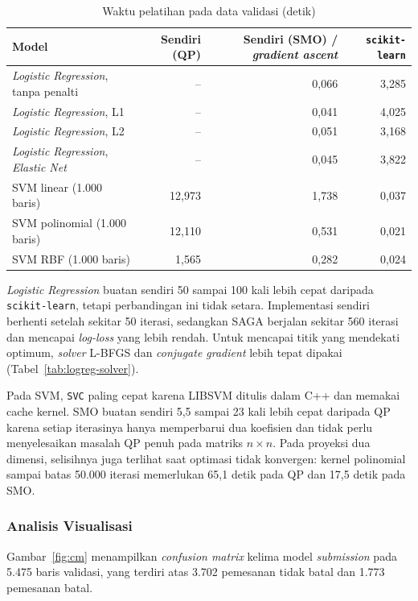 \begin{table}[H]
\centering
\small
\caption{Waktu pelatihan pada data validasi (detik)}
\label{tab:waktu}

\begin{tabular}{@{}lrrr@{}}
\toprule
Model & Sendiri (QP) & Sendiri (SMO) / \textit{gradient ascent} & \texttt{scikit-learn} \\
\midrule
\textit{Logistic Regression}, tanpa penalti & -- & 0,066 & 3,285 \\
\textit{Logistic Regression}, L1 & -- & 0,041 & 4,025 \\
\textit{Logistic Regression}, L2 & -- & 0,051 & 3,168 \\
\textit{Logistic Regression}, \textit{Elastic Net} & -- & 0,045 & 3,822 \\
SVM linear (1.000 baris) & 12,973 & 1,738 & 0,037 \\
SVM polinomial (1.000 baris) & 12,110 & 0,531 & 0,021 \\
SVM RBF (1.000 baris) & 1,565 & 0,282 & 0,024 \\
\bottomrule
\end{tabular}
\end{table}

\textit{Logistic Regression} buatan sendiri 50 sampai 100 kali lebih cepat
daripada \texttt{scikit-learn}, tetapi perbandingan ini tidak setara.
Implementasi sendiri berhenti setelah sekitar 50 iterasi, sedangkan SAGA
berjalan sekitar 560 iterasi dan mencapai \textit{log-loss} yang lebih rendah.
Untuk mencapai titik yang mendekati optimum, \textit{solver} L-BFGS dan
\textit{conjugate gradient} lebih tepat dipakai
(Tabel~\ref{tab:logreg-solver}).

Pada SVM, \texttt{SVC} paling cepat karena LIBSVM ditulis dalam C++ dan
memakai cache kernel. SMO buatan sendiri 5,5 sampai 23 kali lebih cepat
daripada QP karena setiap iterasinya hanya memperbarui dua koefisien dan
tidak perlu menyelesaikan masalah QP penuh pada matriks $n\times n$.
Pada proyeksi dua dimensi, selisihnya juga terlihat saat optimasi tidak
konvergen: kernel polinomial sampai batas 50.000 iterasi memerlukan 65,1
detik pada QP dan 17,5 detik pada SMO.

\subsubsection{Analisis Visualisasi}

Gambar~\ref{fig:cm} menampilkan \textit{confusion matrix} kelima model
\textit{submission} pada 5.475 baris validasi, yang terdiri atas 3.702
pemesanan tidak batal dan 1.773 pemesanan batal.

